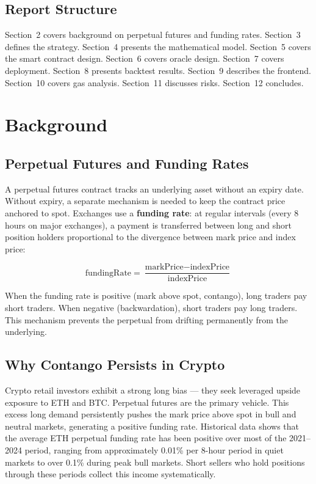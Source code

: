 \documentclass[11pt,a4paper]{article}
\begin{document}
\subsection{Report Structure}

Section~2 covers background on perpetual futures and funding rates. Section~3 defines the strategy. Section~4 presents the mathematical model. Section~5 covers the smart contract design. Section~6 covers oracle design. Section~7 covers deployment. Section~8 presents backtest results. Section~9 describes the frontend. Section~10 covers gas analysis. Section~11 discusses risks. Section~12 concludes.

\section{Background}

\subsection{Perpetual Futures and Funding Rates}

A perpetual futures contract tracks an underlying asset without an expiry date. Without expiry, a separate mechanism is needed to keep the contract price anchored to spot. Exchanges use a \textbf{funding rate}: at regular intervals (every 8 hours on major exchanges), a payment is transferred between long and short position holders proportional to the divergence between mark price and index price:

\[
    \text{fundingRate} = \frac{\text{markPrice} - \text{indexPrice}}{\text{indexPrice}}
\]

When the funding rate is positive (mark above spot, contango), long traders pay short traders. When negative (backwardation), short traders pay long traders. This mechanism prevents the perpetual from drifting permanently from the underlying.

\subsection{Why Contango Persists in Crypto}

Crypto retail investors exhibit a strong long bias --- they seek leveraged upside exposure to ETH and BTC. Perpetual futures are the primary vehicle. This excess long demand persistently pushes the mark price above spot in bull and neutral markets, generating a positive funding rate. Historical data shows that the average ETH perpetual funding rate has been positive over most of the 2021--2024 period, ranging from approximately 0.01\% per 8-hour period in quiet markets to over 0.1\% during peak bull markets. Short sellers who hold positions through these periods collect this income systematically.
\end{document}
